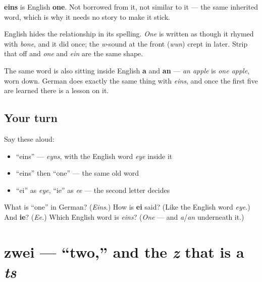 \begin{cousinweb}
\textbf{eins} is English \textbf{one}. Not borrowed from it, not similar to it — the same inherited word, which is why it needs no story to make it stick.

English hides the relationship in its spelling. \emph{One} is written as though it rhymed with \emph{bone}, and it did once; the \emph{w}-sound at the front (\emph{wun}) crept in later. Strip that off and \emph{one} and \emph{ein} are the same shape.

The same word is also sitting inside English \textbf{a} and \textbf{an} — \emph{an apple} is \emph{one apple}, worn down. German does exactly the same thing with \emph{eins}, and once the first five are learned there is a lesson on it.
\end{cousinweb}

\subsection*{Your turn}
Say these aloud:

\begin{itemize}
\raggedright
  \item \textquotedblleft{}eins\textquotedblright{} — \emph{eyns}, with the English word \emph{eye} inside it
  \item \textquotedblleft{}eins\textquotedblright{} then \textquotedblleft{}one\textquotedblright{} — the same old word
  \item \textquotedblleft{}ei\textquotedblright{} as \emph{eye}, \textquotedblleft{}ie\textquotedblright{} as \emph{ee} — the second letter decides
\end{itemize}

\begin{tcolorbox}[breakable,colback=teal!4,colframe=teal!35!black,title={Before you move on}]
What is \textquotedblleft{}one\textquotedblright{} in German? (\emph{Eins}.) How is \textbf{ei} said? (Like the English word \emph{eye}.) And \textbf{ie}? (\emph{Ee}.) Which English word is \emph{eins}? (\emph{One} — and \emph{a}/\emph{an} underneath it.)
\end{tcolorbox}
\section[zwei]{zwei — \textquotedblleft{}two,\textquotedblright{} and the \emph{z} that is a \emph{ts}}

\label{lesson:GE-C06-zwei}



